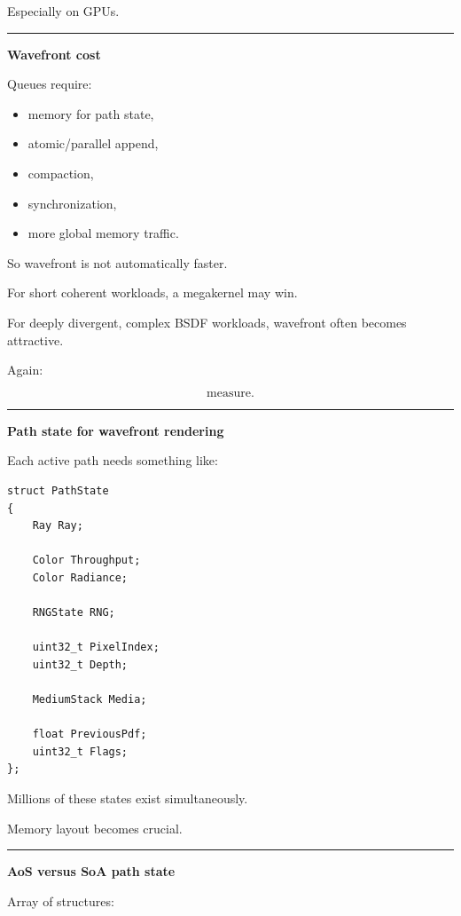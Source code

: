 Especially on GPUs.

\begin{center}\rule{0.5\linewidth}{0.5pt}\end{center}

\textbf{Wavefront cost}

Queues require:

\begin{itemize}
\tightlist
\item
  memory for path state,
\item
  atomic/parallel append,
\item
  compaction,
\item
  synchronization,
\item
  more global memory traffic.
\end{itemize}

So wavefront is not automatically faster.

For short coherent workloads, a megakernel may win.

For deeply divergent, complex BSDF workloads, wavefront often becomes attractive.

Again:

\[
\boxed{\text{measure}.}
\]

\begin{center}\rule{0.5\linewidth}{0.5pt}\end{center}

\textbf{Path state for wavefront rendering}

Each active path needs something like:

\begin{verbatim}
struct PathState
{
    Ray Ray;

    Color Throughput;
    Color Radiance;

    RNGState RNG;

    uint32_t PixelIndex;
    uint32_t Depth;

    MediumStack Media;

    float PreviousPdf;
    uint32_t Flags;
};
\end{verbatim}

Millions of these states exist simultaneously.

Memory layout becomes crucial.

\begin{center}\rule{0.5\linewidth}{0.5pt}\end{center}

\textbf{AoS versus SoA path state}

Array of structures:


